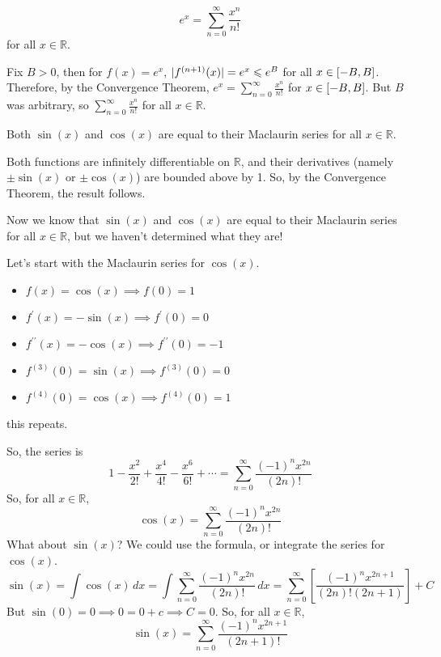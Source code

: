 \begin{Corollary}{}{}
    \[ e^x=\sum\limits_{n=0}^{\infty}\frac{x^n}{n!}  \]
    for all $ x\in\mathbb{R} $.
\end{Corollary}
\begin{Proof}{}{}
    Fix $ B>0 $, then for $ f(x)=e^x $, $ \lvert f^{(n+1)}(x)\rvert=e^x\leqslant e^B $
    for all $ x\in\interval{-B}{B} $. Therefore, by the Convergence
    Theorem, $ \displaystyle e^x=\sum\limits_{n=0}^{\infty} \frac{x^n}{n!}  $ for $ x\in\interval{-B}{B} $.
    But $ B $ was arbitrary, so $ \displaystyle\sum\limits_{n=0}^{\infty} \frac{x^n}{n!} $
    for all $ x\in\mathbb{R} $.
\end{Proof}

\begin{Corollary}{}{}
    Both $ \sin(x) $ and $ \cos(x) $ are equal to their Maclaurin
    series for all $ x\in\mathbb{R} $.
\end{Corollary}

\begin{Proof}{}{}
    Both functions are infinitely differentiable on
    $ \mathbb{R} $, and their derivatives (namely $ \pm \sin(x) $ or $ \pm\cos(x) $)
    are bounded above by 1. So, by the Convergence Theorem,
    the result follows.
\end{Proof}

Now we know that $ \sin(x) $ and $ \cos(x) $ are equal to their
Maclaurin series for all $ x\in\mathbb{R} $, but we haven't
determined what they are!

Let's start with the Maclaurin series for $ \cos(x) $.
\begin{itemize}
    \item $ f(x)=\cos(x)\implies f(0)=1 $
    \item $ f^\prime(x)=-\sin(x)\implies f^\prime(0)=0 $
    \item $ f^{\prime\prime}(x)=-\cos(x)\implies f^{\prime\prime}(0)=-1 $
    \item $ f^{(3)}(0)=\sin(x)\implies f^{(3)}(0)=0 $
    \item $ f^{(4)}(0)=\cos(x)\implies f^{(4)}(0)=1 $
\end{itemize}
this repeats.

So, the series is
\[ 1-\frac{x^2}{2!} +\frac{x^4}{4!} -\frac{x^6}{6!} +\cdots=
    \sum\limits_{n=0}^{\infty} \frac{(-1)^n x^{2n}}{(2n)!}  \]
So, for all $ x\in\mathbb{R} $,
\[ \cos(x)=\sum\limits_{n=0}^{\infty}\frac{(-1)^n x^{2n}}{(2n)!}   \]
What about $ \sin(x) $? We could use the formula, or integrate the
series for $ \cos(x) $.
\[ \sin(x)=\int \cos(x)\, d{x} =
    \int \sum\limits_{n=0}^{\infty} \frac{(-1)^n x^{2n}}{(2n)!} \, d{x}
    =\sum\limits_{n=0}^{\infty} \left[ \frac{(-1)^n x^{2n+1}}{(2n)!(2n+1)} \right]+C  \]
But $ \sin(0)=0\implies 0=0+c\implies C=0 $. So, for all $ x\in\mathbb{R} $,
\[ \sin(x)=\sum\limits_{n=0}^{\infty} \frac{(-1)^n x^{2n+1}}{(2n+1)!}  \]

